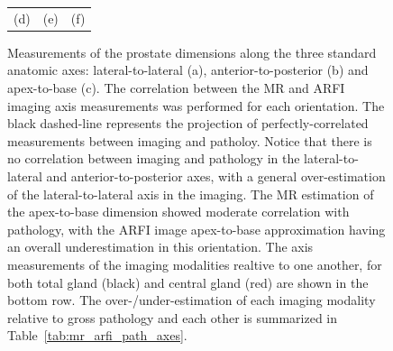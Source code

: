 \begin{figure}[htb!]
\begin{tabular}{ccc}
(d) & (e) & (f) \\
\end{tabular}
\caption{Measurements of the prostate dimensions along the three standard
    anatomic axes: lateral-to-lateral (a), anterior-to-posterior (b) and
    apex-to-base (c).  The correlation between the MR and ARFI imaging axis
    measurements was performed for each orientation.  The black dashed-line
    represents the projection of perfectly-correlated measurements between
    imaging and patholoy.  Notice that there is no correlation between imaging
    and pathology in the lateral-to-lateral and anterior-to-posterior axes,
    with a general over-estimation of the lateral-to-lateral axis in the
    imaging.  The MR estimation of the apex-to-base dimension showed moderate
    correlation with pathology, with the ARFI image apex-to-base approximation
    having an overall underestimation in this orientation.  The axis
    measurements of the imaging modalities realtive to one another, for both
    total gland (black) and central gland (red) are shown in the bottom row.
    The over-/under-estimation of each imaging modality relative to gross
    pathology and each other is summarized in
    Table~\ref{tab:mr_arfi_path_axes}.} 
\label{fig:mr_arfi_path_axes}
\end{figure}
